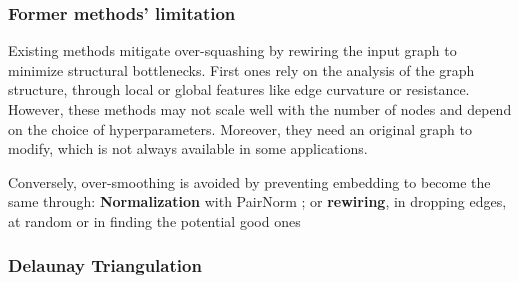 \documentclass{article}
\theoremstyle{plain}
\theoremstyle{definition}
\theoremstyle{remark}
\begin{document}
\subsubsection{Former methods' limitation}
Existing methods mitigate over-squashing by rewiring
the input graph to minimize structural bottlenecks. 
First ones rely on the analysis of the graph structure, through local or global features
like edge curvature or resistance. However, these methods may not scale well with 
the number of nodes and depend on the choice of hyperparameters. 
Moreover, they need an original graph to modify, which is not always available in some applications.

Conversely, over-smoothing is avoided by preventing embedding to become the same 
through: \textbf{Normalization} with PairNorm \cite{zhao2020pairnorm}; 
or \textbf{rewiring}, in dropping edges, at random \cite{rong2019dropedge} 
or in finding the potential good ones \cite{Giraldo_2023}

\subsubsection{Delaunay Triangulation}
\end{document}
